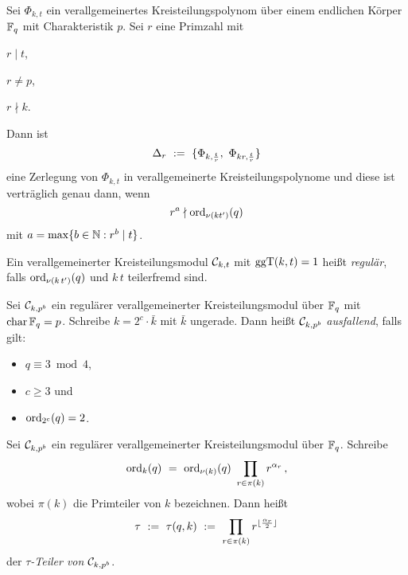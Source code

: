 \begin{satz}
  \label{satz:zerlegungssatz}
  Sei $\Phi_{k,t}$ ein verallgemeinertes Kreisteilungspolynom über einem
  endlichen Körper $\mathbb{F}_q$ mit Charakteristik $p$. Sei $r$ eine Primzahl
  mit

  \begin{itemize*}[itemjoin={\qquad}]
    \item $r \mid t$,
    \item $r \neq p$,
    \item $r \nmid k$.
  \end{itemize*}

  Dann ist 
  \[ \Delta_r \ :=\  \{ \Phi_{k,\frac{t}{r}},\ \Phi_{kr, \frac{t}{r}}\}\]
  eine Zerlegung von $\Phi_{k,t}$ in verallgemeinerte Kreisteilungspolynome und
  diese ist verträglich genau dann, wenn
  \[ r^a \nmid \operatorname{ord}_{\nu(kt')}(q) \]
  mit $a = \max\{ b\in \mathbb{N}: r^b \mid t\}$.
\end{satz}



\begin{definition}[regulär]
  \label{def:regulaer}
  Ein verallgemeinerter Kreisteilungsmodul $\mathcal{C}_{k,t}$ 
  mit $\operatorname{ggT}(k,t)=1$ heißt \emph{regulär},
  falls $\operatorname{ord}_{\nu(k\,t')}(q)$ und $k\,t$ teilerfremd sind.
\end{definition}


\begin{definition}[ausfallend]
  \label{def:ausfallend}
  Sei $\mathcal{C}_{k, p^b}$ ein regulärer verallgemeinerter Kreisteilungsmodul 
  über $\mathbb{F}_q$ mit $\operatorname{char} \mathbb{F}_q = p$. Schreibe $k = 2^c \cdot \bar k$ mit $\bar
  k$ ungerade. Dann heißt $\mathcal{C}_{k,p^b}$ \emph{ausfallend}, falls gilt:
  \begin{itemize}
    \item $q \equiv 3 \bmod 4$,
    \item $c \geq 3$ und 
    \item $\operatorname{ord}_{2^c}(q) = 2$.
  \end{itemize}
\end{definition}

\begin{definition}
  Sei $\mathcal{C}_{k,p^b}$ ein regulärer verallgemeinerter Kreisteilungsmodul über
  $\mathbb{F}_q$. Schreibe
  \[ \operatorname{ord}_k(q) \ =\  \operatorname{ord}_{\nu(k)}(q) \ \prod_{r \in \pi(k)} r^{\alpha_r}\,,\]
  wobei $\pi(k)$ die Primteiler von $k$ bezeichnen.
  Dann heißt
  \[ \tau \ :=\  \tau(q,k) \ :=\  \prod_{r\in \pi(k)} 
    r^{\lfloor \frac{\alpha_r}{2}\rfloor}\]
  der \emph{$\tau$-Teiler von $\mathcal{C}_{k,p^b}$}.
\end{definition}

